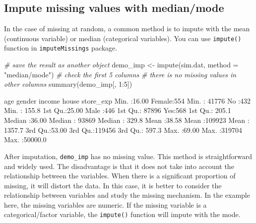 \documentclass[
  12pt,
]{krantz}
\makeatletter
\newenvironment{Shaded}{\begin{snugshade}}{\end{snugshade}}
\newcommand{\AttributeTok}[1]{\textcolor[rgb]{0.61,0.61,0.61}{#1}}
\newcommand{\CommentTok}[1]{\textcolor[rgb]{0.37,0.37,0.37}{\textit{#1}}}
\newcommand{\DecValTok}[1]{\textcolor[rgb]{0.06,0.06,0.06}{#1}}
\newcommand{\FunctionTok}[1]{\textcolor[rgb]{0,0,0}{#1}}
\newcommand{\NormalTok}[1]{#1}
\newcommand{\OtherTok}[1]{\textcolor[rgb]{0.37,0.37,0.37}{#1}}
\newcommand{\SpecialCharTok}[1]{\textcolor[rgb]{0,0,0}{#1}}
\newcommand{\StringTok}[1]{\textcolor[rgb]{0.5,0.5,0.5}{#1}}
\newenvironment{kframe}{%
\medskip{}
\setlength{\fboxsep}{.8em}
 \def\at@end@of@kframe{}%
 \ifinner\ifhmode%
  \def\at@end@of@kframe{\end{minipage}}%
  \begin{minipage}{\columnwidth}%
 \fi\fi%
 \def\FrameCommand##1{\hskip\@totalleftmargin \hskip-\fboxsep
 \colorbox{shadecolor}{##1}\hskip-\fboxsep
     \hskip-\linewidth \hskip-\@totalleftmargin \hskip\columnwidth}%
 \MakeFramed {\advance\hsize-\width
   \@totalleftmargin\z@ \linewidth\hsize
   \@setminipage}}%
 {\par\unskip\endMakeFramed%
 \at@end@of@kframe}
\renewenvironment{Shaded}{\begin{kframe}}{\end{kframe}}
\makeatother
\begin{document}
\hypertarget{impute-missing-values-with-medianmode}{%
\subsection{Impute missing values with median/mode}\label{impute-missing-values-with-medianmode}}

In the case of missing at random, a common method is to impute with the mean (continuous variable) or median (categorical variables). You can use \texttt{impute()} function in \texttt{imputeMissings} package.

\begin{Shaded}
\begin{Highlighting}[]
\CommentTok{\# save the result as another object}
\NormalTok{demo\_imp }\OtherTok{\textless{}{-}} \FunctionTok{impute}\NormalTok{(sim.dat, }\AttributeTok{method =} \StringTok{"median/mode"}\NormalTok{)}
\CommentTok{\# check the first 5 columns}
\CommentTok{\# there is no missing values in other columns}
\FunctionTok{summary}\NormalTok{(demo\_imp[, }\DecValTok{1}\SpecialCharTok{:}\DecValTok{5}\NormalTok{])}
\end{Highlighting}
\end{Shaded}

\begin{Shaded}
\begin{Highlighting}[]
\NormalTok{      age           gender        income       house       store\_exp      }
\NormalTok{ Min.   :16.00   Female:554   Min.   : 41776   No :432   Min.   :  155.8  }
\NormalTok{ 1st Qu.:25.00   Male  :446   1st Qu.: 87896   Yes:568   1st Qu.:  205.1  }
\NormalTok{ Median :36.00                Median : 93869             Median :  329.8  }
\NormalTok{ Mean   :38.58                Mean   :109923             Mean   : 1357.7  }
\NormalTok{ 3rd Qu.:53.00                3rd Qu.:119456             3rd Qu.:  597.3  }
\NormalTok{ Max.   :69.00                Max.   :319704             Max.   :50000.0}
\end{Highlighting}
\end{Shaded}

After imputation, \texttt{demo\_imp} has no missing value. This method is straightforward and widely used. The disadvantage is that it does not take into account the relationship between the variables. When there is a significant proportion of missing, it will distort the data. In this case, it is better to consider the relationship between variables and study the missing mechanism. In the example here, the missing variables are numeric. If the missing variable is a categorical/factor variable, the \texttt{impute()} function will impute with the mode.
\end{document}
